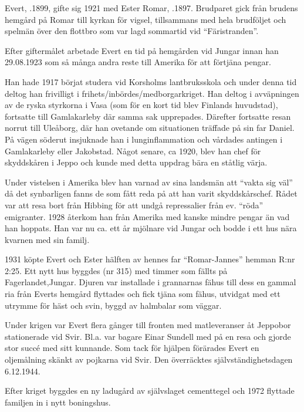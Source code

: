 
Evert, .1899, gifte sig 1921 med Ester Romar, .1897. Brudparet gick från brudens hemgård på Romar till kyrkan för vigsel, tillsammans med hela brudföljet och spelmän över den flottbro som var lagd sommartid vid ``Färistranden''.

Efter giftermålet arbetade Evert en tid på hemgården vid Jungar innan han 29.08.1923 som så många andra reste till Amerika för att förtjäna pengar.

Han hade 1917 börjat studera vid Korsholms lantbruksskola och under denna tid deltog han frivilligt i frihets/inbördes/medborgarkriget. Han deltog i avväpningen av de ryska styrkorna i Vasa (som för en kort tid blev Finlands huvudstad), fortsatte till Gamlakarleby där samma sak upprepades. Därefter fortsatte resan norrut till Uleåborg, där han ovetande om situationen träffade på sin far Daniel. På vägen söderut insjuknade han i lunginflammation och vårdades antingen i Gamlakarleby eller Jakobstad. Något senare, ca 1920, blev han chef för skyddskåren i Jeppo och kunde med detta uppdrag bära en ståtlig värja.

Under vistelsen i Amerika blev han varnad av sina landsmän att ``vakta sig väl'' då det synbarligen fanns de som fått reda på att han varit skyddskårschef. Rådet var att resa bort från Hibbing för att undgå repressalier från ev. ``röda'' emigranter. 1928 återkom han från Amerika med kanske mindre pengar än vad han hoppats. Han var nu ca. ett år mjölnare vid Jungar och bodde i ett hus nära kvarnen med sin familj.

1931 köpte Evert och Ester hälften av hennes far ``Romar-Jannes'' hemman R:nr 2:25. Ett nytt hus byggdes (nr 315) med timmer som fällts på Fagerlandet,Jungar. Djuren var installade i grannarnas fähus till dess en gammal ria från Everts hemgård flyttades och fick tjäna som fähus, utvidgat med  ett utrymme för häst och svin, byggd av halmbalar som väggar.

Under krigen var Evert flera gånger till fronten med matleveranser åt Jeppobor stationerade vid Svir. Bl.a. var bagare Einar Sundell med på en resa och gjorde stor succé med sitt kunnande. Som tack för hjälpen förärades Evert en oljemålning skänkt av pojkarna vid Svir. Den överräcktes självständighetsdagen 6.12.1944.

Efter kriget byggdes en ny ladugård av självslaget cementtegel och 1972 flyttade familjen in i nytt boningshus.

